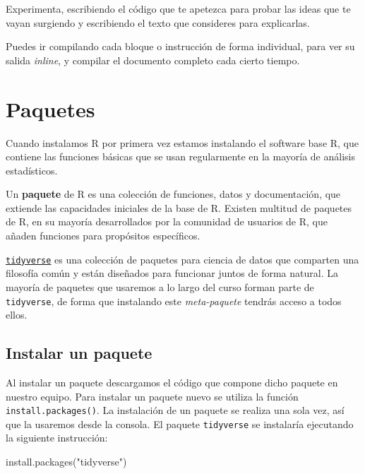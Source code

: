 \documentclass[
  title=normal,
  notoc,
  bib=normal]{mnye}
\newenvironment{Shaded}{\begin{snugshade}}{\end{snugshade}}
\newcommand{\FunctionTok}[1]{\textcolor[rgb]{0.00,0.00,0.00}{#1}}
\newcommand{\NormalTok}[1]{#1}
\newcommand{\StringTok}[1]{\textcolor[rgb]{0.31,0.60,0.02}{#1}}
\begin{document}
Experimenta, escribiendo el código que te apetezca para probar las ideas que te vayan surgiendo y escribiendo el texto que consideres para explicarlas.

Puedes ir compilando cada bloque o instrucción de forma individual, para ver su salida \emph{inline}, y compilar el documento completo cada cierto tiempo.

\hypertarget{packages}{%
\section{Paquetes}\label{packages}}

Cuando instalamos \textsf{R} por primera vez estamos instalando el software \textsf{base R}, que contiene las funciones básicas que se usan regularmente en la mayoría de análisis estadísticos.

Un \textbf{paquete} de R es una colección de funciones, datos y documentación, que extiende las capacidades iniciales de la base de \textsf{R}. Existen multitud de paquetes de \textsf{R}, en su mayoría desarrollados por la comunidad de usuarios de \textsf{R}, que añaden funciones para propósitos específicos.

\href{https://www.tidyverse.org/}{\texttt{tidyverse}} es una colección de paquetes para ciencia de datos que comparten una filosofía común y están diseñados para funcionar juntos de forma natural.
La mayoría de paquetes que usaremos a lo largo del curso forman parte de \texttt{tidyverse}, de forma que instalando este \emph{meta-paquete} tendrás acceso a todos ellos.

\hypertarget{install}{%
\subsection{Instalar un paquete}\label{install}}

Al instalar un paquete descargamos el código que compone dicho paquete en nuestro equipo.
Para instalar un paquete nuevo se utiliza la función \texttt{install.packages()}. La instalación de un paquete se realiza una sola vez, así que la usaremos desde la consola. El paquete \texttt{tidyverse} se instalaría ejecutando la siguiente instrucción:

\begin{Shaded}
\begin{Highlighting}[]
\FunctionTok{install.packages}\NormalTok{(}\StringTok{"tidyverse"}\NormalTok{)}
\end{Highlighting}
\end{Shaded}
\end{document}
